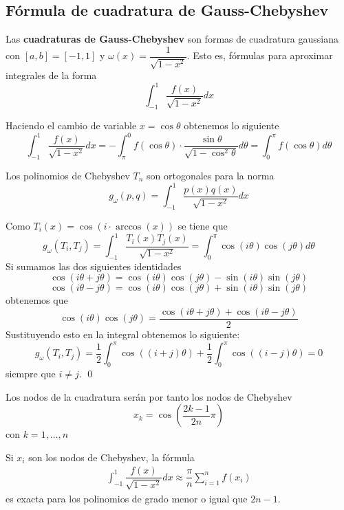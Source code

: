 \subsection{Fórmula de cuadratura de Gauss-Chebyshev}
\begin{defin}
Las \textbf{cuadraturas de Gauss-Chebyshev} son formas de cuadratura gaussiana con $[a,b]=[-1,1]$ y $\omega(x)=\dfrac{1}{\sqrt{1-x^2}}$. Esto es, fórmulas para aproximar integrales de la forma
$$\int_{-1}^1\dfrac{f(x)}{\sqrt{1-x^2}}dx$$
\end{defin}
\begin{obs}
Haciendo el cambio de variable $x=\cos\theta$ obtenemos lo siguiente
$$\int_{-1}^1\dfrac{f(x)}{\sqrt{1-x^2}}dx=-\int_{\pi}^0f(\cos\theta)\cdot \dfrac{\sin\theta}{\sqrt{1-\cos^2\theta}}d\theta=\int_0^\pi f(\cos\theta)d\theta$$  
\end{obs}
\begin{lem}
Los polinomios de Chebyshev $T_n$ son ortogonales para la norma
$$g_{\omega}(p,q)=\int_{-1}^1\dfrac{p(x)q(x)}{\sqrt{1-x^2}}dx$$
\end{lem}
\begin{dem}
Como $T_i(x)=\cos(i\cdot \arccos(x))$ se tiene que
$$g_{\omega}(T_i,T_j)=\int_{-1}^1\dfrac{T_i(x)T_j(x)}{\sqrt{1-x^2}}=\int_0^{\pi}\cos(i\theta)\cos(j\theta)d\theta$$
Si sumamos las dos siguientes identidades
$$\cos(i\theta+j\theta)=\cos(i\theta)\cos(j\theta)-\sin(i\theta)\sin(j\theta)$$
$$\cos(i\theta-j\theta)=\cos(i\theta)\cos(j\theta)+\sin(i\theta)\sin(j\theta)$$
obtenemos que
$$\cos(i\theta)\cos(j\theta)=\dfrac{\cos(i\theta+j\theta)+\cos(i\theta-j\theta)}{2}$$
Sustituyendo esto en la integral obtenemos lo siguiente:
$$g_\omega(T_i,T_j)=\dfrac{1}{2}\int_0^{\pi}\cos((i+j)\theta)+\dfrac{1}{2}\int_0^{\pi}\cos((i-j)\theta)=0$$
siempre que $i\neq j$.
\qed\end{dem}
\begin{cor}
Los nodos de la cuadratura serán por tanto los nodos de Chebyshev
$$x_k=\cos\left(\dfrac{2k-1}{2n}\pi\right)$$
con $k=1,\ldots,n$
\end{cor}
\begin{prop} Si $x_i$ son los nodos de Chebyshev, la fórmula
\begin{align}
 \int_{-1}^1\dfrac{f(x)}{\sqrt{1-x^2}}dx\approx\dfrac{\pi}{n}\sum_{i=1}^nf(x_i)
 \label{gauss:cheb}
\end{align}
es exacta para los polinomios de grado menor o igual que $2n-1$.
\end{prop}

